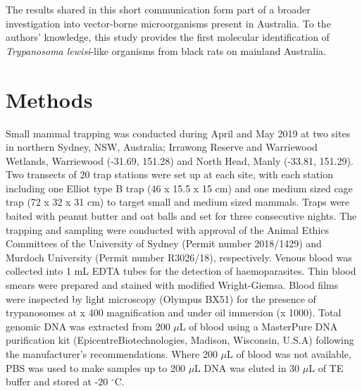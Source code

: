 \documentclass[a4paper, nobind]{templates/ociamthesis}
\begin{document}
The results shared in this short communication form part of a broader investigation into vector-borne microorganisms present in Australia. To the authors' knowledge, this study provides the first molecular identification of \emph{Trypanosoma lewisi}-like organisms from black rats on mainland Australia.

\hypertarget{methods-3}{%
\section{Methods}\label{methods-3}}

Small mammal trapping was conducted during April and May 2019 at two sites in northern Sydney, NSW, Australia; Irrawong Reserve and Warriewood Wetlands, Warriewood (-31.69, 151.28) and North Head, Manly (-33.81, 151.29). Two transects of 20 trap stations were set up at each site, with each station including one Elliot type B trap (46 x 15.5 x 15 cm) and one medium sized cage trap (72 x 32 x 31 cm) to target small and medium sized mammals. Traps were baited with peanut butter and oat balls and set for three consecutive nights. The trapping and sampling were conducted with approval of the Animal Ethics Committees of the University of Sydney (Permit number 2018/1429) and Murdoch University (Permit number R3026/18), respectively. Venous blood was collected into 1 mL EDTA tubes for the detection of haemoparasites. Thin blood smears were prepared and stained with modified Wright-Giemsa. Blood films were inspected by light microscopy (Olympus BX51) for the presence of trypanosomes at x 400 magnification and under oil immersion (x 1000). Total genomic DNA was extracted from 200 \(\mu\)L of blood using a MasterPure DNA purification kit (Epicentre\textregistered Biotechnologies, Madison, Wisconsin, U.S.A) following the manufacturer's recommendations. Where 200 \(\mu\)L of blood was not available, PBS was used to make samples up to 200 \(\mu\)L DNA was eluted in 30 \(\mu\)L of TE buffer and stored at -20 \(^\circ\)C.
\end{document}
